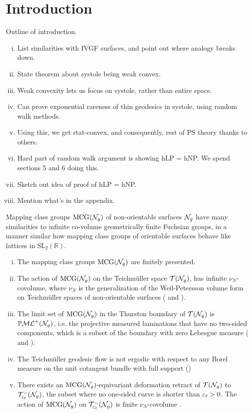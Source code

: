 \section{Introduction}
\label{sec:introduction}

{\color{red} Outline of introduction.}
\begin{enumerate}[(i)]
\item List similarities with IVGF surfaces, and point out where analogy breaks down.
\item State theorem about systole being weak convex.
\item Weak convexity lets us focus on systole, rather than entire space.
\item Can prove exponential rareness of thin geodesics in systole, using random walk methods.
\item Using this, we get stat-convex, and consequently, rest of PS theory thanks to others.
\item Hard part of random walk argument is showing hLP = hNP. We spend sections 5 and 6 doing this.
\item Sketch out idea of proof of hLP = hNP.
\item Mention what's in the appendix.
\end{enumerate}

Mapping class groups $\mathrm{MCG}(\mathcal{N}_g)$ of non-orientable surfaces $\mathcal{N}_g$ have many similarities to infinite co-volume geometrically finite Fuchsian groups, in a manner similar how mapping class groups of orientable surfaces behave like lattices in $\mathrm{SL}_2(\mathbb{R})$.

\begin{enumerate}[(i)]
\item The mapping class groups $\mathrm{MCG}(\mathcal{N}_g)$ are finitely presented.
\item The action of $\mathrm{MCG}(\mathcal{N}_g)$ on the Teichmüller space $\mathcal{T}(\mathcal{N}_g)$, has infinite $\nu_N$-covolume, where $\nu_N$ is the generalization of the Weil-Petersson volume form on Teichmüller spaces of non-orientable surfaces (\cite[Theorem 17.1]{gendulphe2017whats} and \cite{norbury2008lengths}).
\item The limit set of $\mathrm{MCG}(\mathcal{N}_g)$ in the Thurston boundary of $\mathcal{T}(\mathcal{N}_g)$ is $\mathbb{P}\mathcal{ML}^+(\mathcal{N}_g)$, i.e. the projective measured laminations that have no two-sided components, which is a subset of the boundary with zero Lebesgue measure (\cite{erlandsson2023mapping} and \cite{limitsetkhan}).
\item The Teichmüller geodesic flow is not ergodic with respect to any Borel measure on the unit cotangent bundle with full support (\cite[Proposition 17.5]{gendulphe2017whats})
\item There exists an $\mathrm{MCG}(\mathcal{N}_g)$-equivariant deformation retract of $\mathcal{T}(\mathcal{N}_g)$ to $\mathcal{T}_{\varepsilon_t}^{-}(\mathcal{N}_g)$, the subset where no one-sided curve is shorter than $\varepsilon_t > 0$. The action of $\mathrm{MCG}(\mathcal{N}_g)$ on $\mathcal{T}_{\varepsilon_t}^{-}(\mathcal{N}_g)$ is finite $\nu_N$-covolume \cite[Proposition 19.1]{gendulphe2017whats}.
\end{enumerate}

